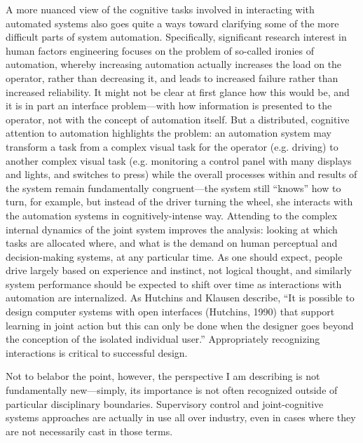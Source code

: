A more nuanced view of the cognitive tasks involved in interacting
with automated systems also goes quite a ways toward clarifying some
of the more difficult parts of system automation. Specifically,
significant research interest in human factors engineering focuses on
the problem of so-called ironies of automation, whereby increasing automation actually
increases the load on the operator, rather than decreasing it, and
leads to increased failure rather than increased
reliability.\cite{???-somethingin-hutchins} It might
not be clear at first glance how this would be, and it is in part an
interface problem---with how information is presented to the operator,
not with the concept of automation itself. But a distributed,
cognitive attention to automation highlights the problem:  an
automation system may transform a task from a complex visual task for the
operator (e.g. driving) to another complex visual task (e.g. monitoring a control
panel with many displays and lights, and switches to press) while the
overall processes within and results of the system remain
fundamentally congruent---the system still ``knows'' how to turn, for
example, but instead of the driver turning the wheel, she interacts
with the automation systems in cognitively-intense way. Attending to
the complex internal dynamics of
the joint system improves the analysis: looking at which tasks are
allocated where, and what is the demand on human perceptual and
decision-making systems, at any particular time. As one should expect,
people drive largely based on experience and instinct,\cite{article-http://www.telegraph.co.uk/news/science/science-news/11410261/Driverless-car-beats-racing-driver-for-first-time.html} not logical
thought, and similarly system performance should be expected to shift
over time as interactions with automation are internalized. As
Hutchins and Klausen describe, ``It is possible to design computer systems with open
interfaces (Hutchins, 1990) that support learning in joint action but
this can only be done when the designer goes beyond the conception of
the isolated individual user.''\cite[p. 13]{hutchinsKlausen}
Appropriately recognizing interactions is critical to successful design.

Not to belabor the point, however, the perspective I am describing is
not fundamentally new---simply, its importance is not often
recognized outside of particular disciplinary boundaries. Supervisory control and 
joint-cognitive systems approaches are actually in use all over
industry, even in cases where they are not necessarily cast in
those terms. 

